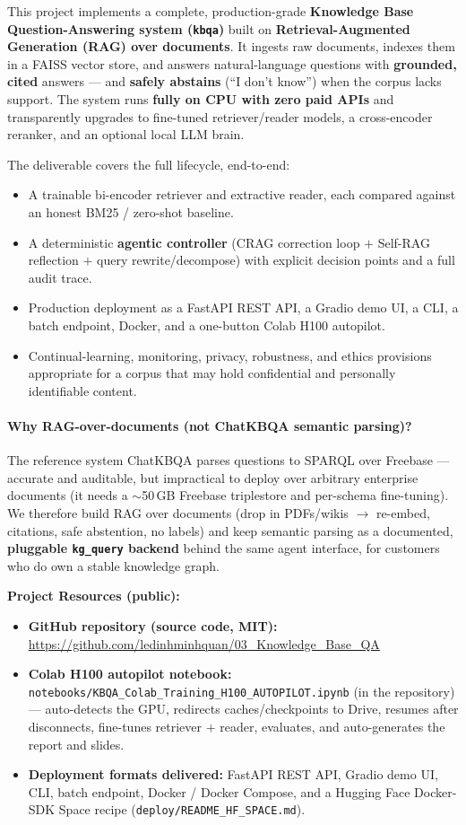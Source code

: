 \documentclass[12pt,a4paper]{article}
\begin{document}
This project implements a complete, production-grade \textbf{Knowledge Base Question-Answering system (\texttt{kbqa})} built on \textbf{Retrieval-Augmented Generation (RAG) over documents}. It ingests raw documents, indexes them in a FAISS vector store, and answers natural-language questions with \textbf{grounded, cited} answers --- and \textbf{safely abstains} (``I don't know'') when the corpus lacks support. The system runs \textbf{fully on CPU with zero paid APIs} and transparently upgrades to fine-tuned retriever/reader models, a cross-encoder reranker, and an optional local LLM brain.

The deliverable covers the full lifecycle, end-to-end:
\begin{itemize}
  \item A trainable bi-encoder retriever and extractive reader, each compared against an honest BM25 / zero-shot baseline.
  \item A deterministic \textbf{agentic controller} (CRAG correction loop $+$ Self-RAG reflection $+$ query rewrite/decompose) with explicit decision points and a full audit trace.
  \item Production deployment as a FastAPI REST API, a Gradio demo UI, a CLI, a batch endpoint, Docker, and a one-button Colab H100 autopilot.
  \item Continual-learning, monitoring, privacy, robustness, and ethics provisions appropriate for a corpus that may hold confidential and personally identifiable content.
\end{itemize}

\paragraph{Why RAG-over-documents (not ChatKBQA semantic parsing)?} The reference system ChatKBQA parses questions to SPARQL over Freebase --- accurate and auditable, but impractical to deploy over arbitrary enterprise documents (it needs a $\sim$50\,GB Freebase triplestore and per-schema fine-tuning). We therefore build RAG over documents (drop in PDFs/wikis $\rightarrow$ re-embed, citations, safe abstention, no labels) and keep semantic parsing as a documented, \textbf{pluggable \texttt{kg\_query} backend} behind the same agent interface, for customers who do own a stable knowledge graph.

\textbf{Project Resources (public):}
\begin{itemize}\setlength\itemsep{0.15em}
  \item \textbf{GitHub repository (source code, MIT):} \url{https://github.com/ledinhminhquan/03_Knowledge_Base_QA}
  \item \textbf{Colab H100 autopilot notebook:} \texttt{notebooks/KBQA\_Colab\_Training\_H100\_AUTOPILOT.ipynb} (in the repository) --- auto-detects the GPU, redirects caches/checkpoints to Drive, resumes after disconnects, fine-tunes retriever $+$ reader, evaluates, and auto-generates the report and slides.
  \item \textbf{Deployment formats delivered:} FastAPI REST API, Gradio demo UI, CLI, batch endpoint, Docker / Docker Compose, and a Hugging Face Docker-SDK Space recipe (\texttt{deploy/README\_HF\_SPACE.md}).
\end{itemize}
\end{document}
